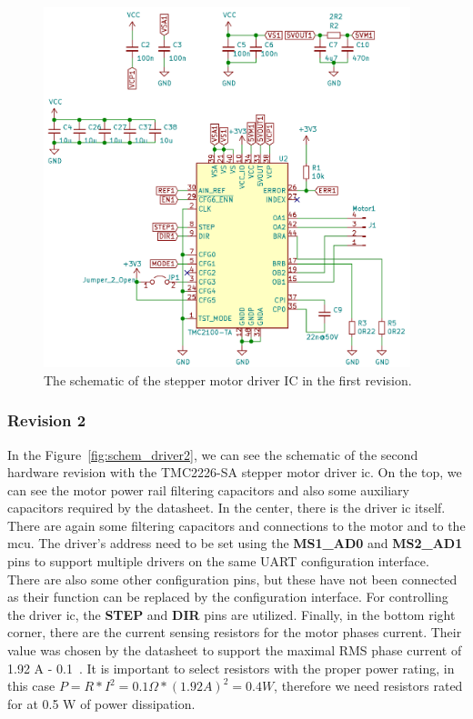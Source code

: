\begin{figure}[H]
    \centering
    \includegraphics[width=0.95\textwidth]{obrazky/schem_driver_rev1}
    \caption{The schematic of the stepper motor driver IC in the first revision.}
    \label{fig:schem_driver1}
\end{figure}

\subsubsection{Revision 2}
In the Figure~\ref{fig:schem_driver2}, we can see the schematic of the second hardware revision with the TMC2226-SA stepper motor driver \acs{ic}.
On the top, we can see the motor power rail filtering capacitors and also some auxiliary capacitors required by the datasheet.
In the center, there is the driver \acs{ic} itself.
There are again some filtering capacitors and connections to the motor and to the \acs{mcu}.
The driver's address need to be set using the \textbf{MS1\_AD0} and \textbf{MS2\_AD1} pins to support multiple drivers on the same UART configuration interface.
There are also some other configuration pins, but these have not been connected as their function can be replaced by the configuration interface.
For controlling the driver \acs{ic}, the \textbf{STEP} and \textbf{DIR} pins are utilized.
Finally, in the bottom right corner, there are the current sensing resistors for the motor phases current.
Their value was chosen by the datasheet to support the maximal RMS phase current of 1.92 A - 0.1~\textohm.
It is important to select resistors with the proper power rating, in this case $P = R * I^2 = 0.1\Omega * (1.92 A)^2 = 0.4 W$, therefore we need resistors rated for at 0.5 W of power dissipation.

